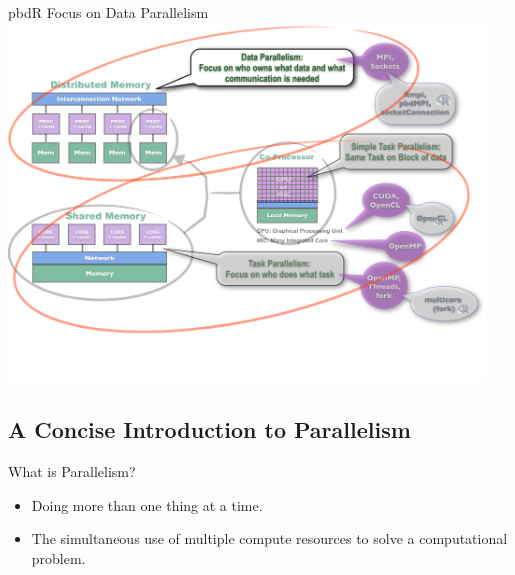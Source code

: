 \begin{frame}
\begin{block}{pbdR Focus on Data Parallelism}
    \includegraphics[width=0.95\textwidth]{../common/pics/ParallelHardware11.pdf}
\end{block}
\end{frame}

\setcounter{framenumber}{0}

\subsection{A Concise Introduction to Parallelism}

\begin{frame}
  \begin{block}{What is Parallelism?}\pause
  \begin{itemize}
    \item Doing more than one thing at a time.
    \item The simultaneous use of multiple compute resources to solve a computational problem.
  \end{itemize}
  \end{block}
\end{frame}

